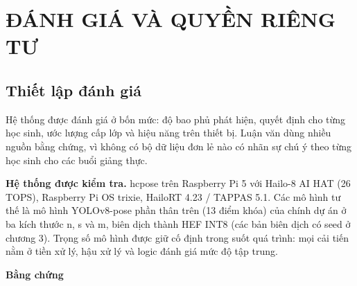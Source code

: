 \chapter{ĐÁNH GIÁ VÀ QUYỀN RIÊNG TƯ}

\section{Thiết lập đánh giá}

Hệ thống được đánh giá ở bốn mức: độ bao phủ phát hiện, quyết định cho từng học sinh, ước lượng cấp lớp và hiệu năng trên thiết bị. Luận văn dùng nhiều nguồn bằng chứng, vì không có bộ dữ liệu đơn lẻ nào có nhãn sự chú ý theo từng học sinh cho các buổi giảng thực.

\textbf{Hệ thống được kiểm tra.} hcpose trên Raspberry Pi 5 với Hailo-8 AI HAT (26 TOPS), Raspberry Pi OS trixie, HailoRT 4.23 / TAPPAS 5.1. Các mô hình tư thế là mô hình YOLOv8-pose phần thân trên (13 điểm khóa) của chính dự án ở ba kích thước n, s và m, biên dịch thành HEF INT8 (các bản biên dịch có seed ở chương 3). Trọng số mô hình được giữ cố định trong suốt quá trình: mọi cải tiến nằm ở tiền xử lý, hậu xử lý và logic đánh giá mức độ tập trung.

\textbf{Bằng chứng}

